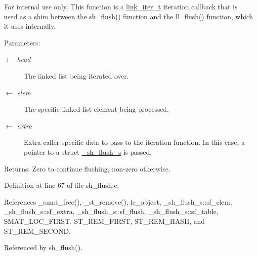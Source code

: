 \begin{Desc}
\item[For internal use only.]
This function is a \hyperlink{group__dbprim__link_ga2}{link\_\-iter\_\-t} iteration callback that is used as a shim between the \hyperlink{group__dbprim__smat_ga22}{sh\_\-flush()} function and the \hyperlink{group__dbprim__link_ga11}{ll\_\-flush()} function, which it uses internally.

\begin{Desc}
\item[Parameters:]
\begin{description}
\item[\mbox{$\leftarrow$} {\em head}]The linked list being iterated over. \item[\mbox{$\leftarrow$} {\em elem}]The specific linked list element being processed. \item[\mbox{$\leftarrow$} {\em extra}]Extra caller-specific data to pass to the iteration function. In this case, a pointer to a struct \hyperlink{struct__sh__flush__s}{\_\-sh\_\-flush\_\-s} is passed.\end{description}
\end{Desc}
\begin{Desc}
\item[Returns:]Zero to continue flushing, non-zero otherwise.\end{Desc}
\end{Desc}


Definition at line 67 of file sh\_\-flush.c.

References \_\-smat\_\-free(), \_\-st\_\-remove(), le\_\-object, \_\-sh\_\-flush\_\-s::sf\_\-elem, \_\-sh\_\-flush\_\-s::sf\_\-extra, \_\-sh\_\-flush\_\-s::sf\_\-flush, \_\-sh\_\-flush\_\-s::sf\_\-table, SMAT\_\-LOC\_\-FIRST, ST\_\-REM\_\-FIRST, ST\_\-REM\_\-HASH, and ST\_\-REM\_\-SECOND.

Referenced by sh\_\-flush().

